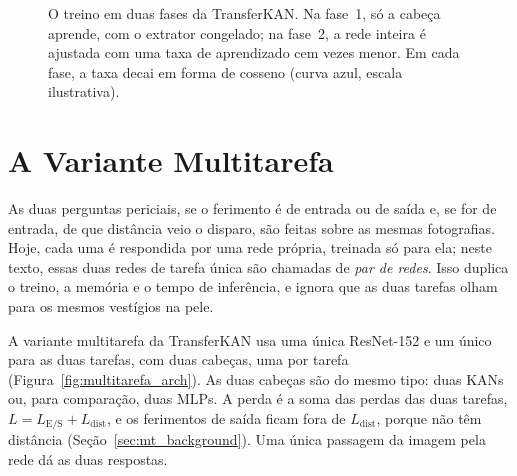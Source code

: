 \begin{figure}[htpb]
\centering
{}
\caption{O treino em duas fases da TransferKAN. Na fase~1, só a cabeça aprende, com o extrator congelado; na fase~2, a rede inteira é ajustada com uma taxa de aprendizado cem vezes menor. Em cada fase, a taxa decai em forma de cosseno (curva azul, escala ilustrativa).}
\label{fig:duas_fases}
\end{figure}

\section{A Variante Multitarefa}
\label{sec:transferkan_mt}

As duas perguntas periciais, se o ferimento é de entrada ou de saída e, se for de entrada, de que distância veio o disparo, são feitas sobre as mesmas fotografias. Hoje, cada uma é respondida por uma rede própria, treinada só para ela; neste texto, essas duas redes de tarefa única são chamadas de \emph{par de redes}. Isso duplica o treino, a memória e o tempo de inferência, e ignora que as duas tarefas olham para os mesmos vestígios na pele.

A variante multitarefa da TransferKAN usa uma única ResNet-152 e um único  para as duas tarefas, com duas cabeças, uma por tarefa (Figura~\ref{fig:multitarefa_arch}). As duas cabeças são do mesmo tipo: duas KANs ou, para comparação, duas MLPs. A perda é a soma das perdas das duas tarefas, $L = L_{\mathrm{E/S}} + L_{\mathrm{dist}}$, e os ferimentos de saída ficam fora de $L_{\mathrm{dist}}$, porque não têm distância (Seção~\ref{sec:mt_background}). Uma única passagem da imagem pela rede dá as duas respostas.

